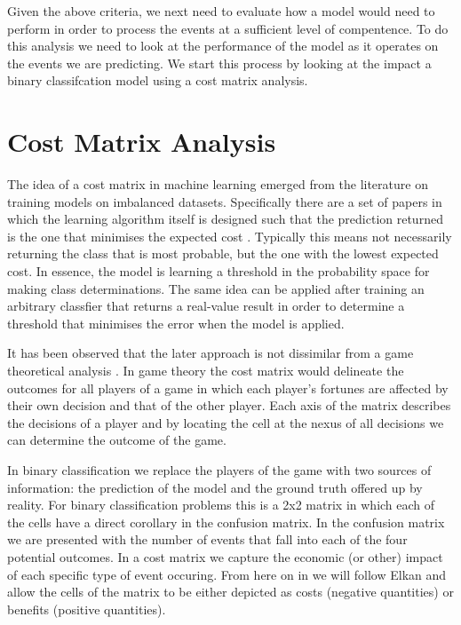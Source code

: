 \documentclass[11pt,a4paper]{article}
\begin{document}
Given the above criteria, we next need to evaluate how a model would need to perform in order to process the events
at a sufficient level of compentence. To do this analysis
we need to look at the performance of the model as it operates on the events we are predicting. We start this
process by looking at the impact a binary classifcation model using a cost matrix analysis.

\section{Cost Matrix Analysis}

The idea of a cost matrix in machine learning emerged from the literature on training models on imbalanced datasets. Specifically
there are a set of papers in which the learning algorithm itself is designed such that the prediction returned is the one that
minimises the expected cost \cite{Elkan2001,Margineantu2000}.
Typically this means not necessarily returning the class that is most probable, but the one with the
lowest expected cost. In essence, the model is learning a threshold in the probability space for making class
determinations. The same idea can be applied after training an arbitrary classfier that returns a real-value result
in order to determine a threshold that minimises the error when the model is applied.

It has been observed that the later approach is not dissimilar from a game theoretical analysis \cite{Sanchez17}.
In game theory the cost matrix would delineate the outcomes for all players of a game in which each player's fortunes
are affected by their own decision and that of the other player. Each axis of the matrix describes the decisions of a player
and by locating the cell at the nexus of all decisions we can determine the outcome of the game.

In binary classification we replace the players of the game with two sources of information: the prediction of the model and
the ground truth offered up by reality. For binary classification problems this is a 2x2 matrix in which each of the cells have
a direct corollary in the confusion matrix. In the confusion matrix we are presented with the number of events that fall into
each of the four potential outcomes. In a cost matrix we capture the economic (or other) impact of each specific type of event
occuring. From here on in we will follow Elkan \cite{Elkan2001} and allow the cells of the matrix to be either depicted as
costs (negative quantities) or benefits (positive quantities).
\end{document}
